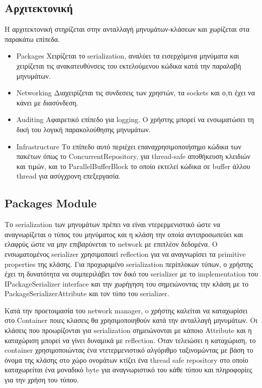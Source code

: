 		\subsection{Αρχιτεκτονική}	
		Η αρχιτεκτονική στηρίζεται στην ανταλλαγή μηνυμάτων-κλάσεων και χωρίζεται στα παρακάτω επίπεδα.
			\begin{itemize}
				\item {Packages} Χειρίζεται το serialization, αναλύει τα εισερχόμενα μηνύματα και χειρίζεται τις ανακατευθύνσεις του εκτελούμενου κώδικα κατά την παραλαβή μηνυμάτων. 
				\item {Networking} Διαχειρίζεται τις συνδεσεις των χρηστών, τα sockets και ο,τι έχει να κάνει με διασύνδεση.
				\item {Auditing} Αφαιρετικό επίπεδο για logging. Ο χρήστης μπορεί να ενσωματώσει τη δική του λογική παρακολούθησης μηνυμάτων.
				\item{Infrastructure} Το επίπεδο αυτό περιέχει επαναχρησιμοποιήσημο κώδικα των πακέτων όπως το ConcurrentRepository, για thread-safe αποθήκευση κλειδιών και τιμών, και το ParallelBufferBlock το οποίο εκτελεί κώδικα σε buffer άλλου thread για ασύγχρονη επεξεργασία.
			\end{itemize}
			
			\subsection{Packages Module}	 
			Το serialization των μηνυμάτων πρέπει να είναι ντερερμενιστικό ώστε να αναγνωρίζεται ο τύπος του μηνύματος και η κλάση την οποία αντιπροσωπεύει και ελαφρύς ώστε να μην επιβαρύνεται το network με επιπλέον δεδομένα. Ο ενσωματομένος serializer χρησιμοποιεί reflection για να αναγνωρίσει τα primitive properties της κλάσης. Για προχωριμένο serialization περίπλοκων τύπων, ο χρήστης έχει τη δυνατότητα να συμπεριλάβει τον δικό του serializer με το implementation του IPackageSerializer interface και την χωρήγηση του σημειώνοντας την κλάση με το PackageSerializerAttribute και τον τύπο του serializer.
			
			
			Κατά την προετοιμασία του network manager, o χρήστης καλείται να καταχωρίσει στο Container ποιες κλασεις θα χρησιμοποιηθούν κατά την ανταλλαγή μηνυμάτων. Οι κλάσεις που προωρίζονται για serialization σημειώνονται με κάποιο Attribute και η καταχώριση μπορεί να γίνει δυναμικά με reflection.
			Όταν τελειώσει η καταχώριση, το container χρησιμοποιώντας ένα ντετερμενιστικό αλγόριθμο ταξινομώντας με βάση το όνομα της κλάσης στο χώρο ονομάτων κτίζει ένα thread safe repository στο οποίο καταχωρείται ένα μοναδικό byte για αναγνωριστικό του κάθε τύπου και πληροφορίες για την χρήση του τύπου.
			
